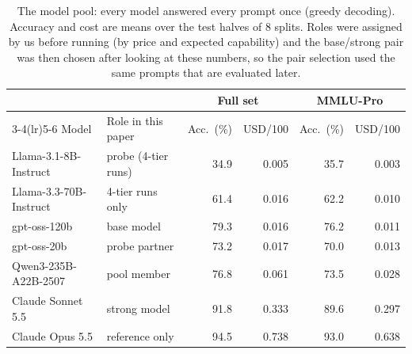 \begin{table}[!htbp]
\centering\small
\caption{The model pool: every model answered every prompt once (greedy decoding). Accuracy and cost are means over the test halves of 8 splits. Roles were assigned by us before running (by price and expected capability) and the base/strong pair was then chosen after looking at these numbers, so the pair selection used the same prompts that are evaluated later.}\label{tab:pool}
\begin{tabular}{llrrrr}
\toprule
 & & \multicolumn{2}{c}{Full set} & \multicolumn{2}{c}{MMLU-Pro} \\
\cmidrule(lr){3-4}\cmidrule(lr){5-6}
Model & Role in this paper & Acc.\ (\%) & USD/100 & Acc.\ (\%) & USD/100 \\
\midrule
Llama-3.1-8B-Instruct & probe (4-tier runs) & 34.9 & 0.005 & 35.7 & 0.003 \\
Llama-3.3-70B-Instruct & 4-tier runs only & 61.4 & 0.016 & 62.2 & 0.010 \\
gpt-oss-120b & base model & 79.3 & 0.016 & 76.2 & 0.011 \\
gpt-oss-20b & probe partner & 73.2 & 0.017 & 70.0 & 0.013 \\
Qwen3-235B-A22B-2507 & pool member & 76.8 & 0.061 & 73.5 & 0.028 \\
Claude Sonnet 5.5 & strong model & 91.8 & 0.333 & 89.6 & 0.297 \\
Claude Opus 5.5 & reference only & 94.5 & 0.738 & 93.0 & 0.638 \\
\bottomrule
\end{tabular}
\end{table}
